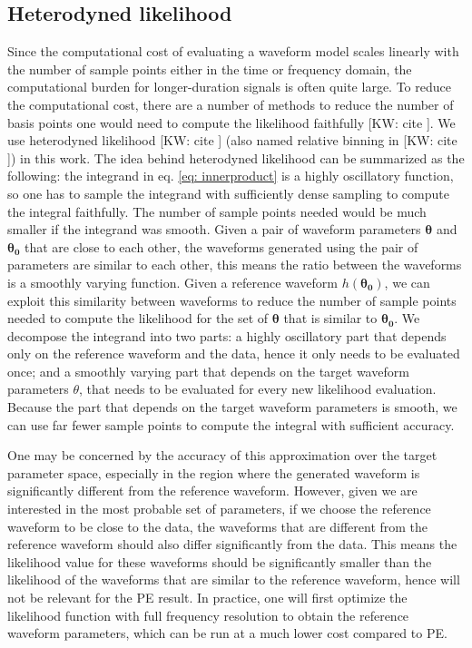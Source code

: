 \documentclass[twocolumn]{aastex631}
\newcommand{\kw}[1]{{\color{rb4}[KW: #1 ]}}
\begin{document}
\subsection{Heterodyned likelihood}

Since the computational cost of evaluating a waveform model scales linearly with
the number of sample points either in the time or frequency domain, the
computational burden for longer-duration signals is often quite large. To
reduce the computational cost, there are a number of methods to reduce the
number of basis points one would need to compute the likelihood faithfully
\kw{cite}. We use heterodyned likelihood \kw{cite} (also named relative binning
in \kw{cite}) in this work. The idea behind heterodyned likelihood can be
summarized as the following: the integrand in eq. \ref{eq: innerproduct} is
a highly oscillatory function, so one has to sample the integrand with
sufficiently dense sampling to compute the integral faithfully. The number of
sample points needed would be much smaller if the integrand was smooth. Given a
pair of waveform parameters $\mathbf{\theta}$ and $\mathbf{\theta_0}$ that are
close to each other, the waveforms generated using the pair of parameters are
similar to each other, this means the ratio between the waveforms is a smoothly
varying function. Given a reference waveform $h(\mathbf{\theta_0})$, we can
exploit this similarity between waveforms to reduce the number of sample points
needed to compute the likelihood for the set of $\mathbf{\theta}$ that is
similar to $\mathbf{\theta_0}$. We decompose the integrand into two parts: a
highly oscillatory part that depends only on the reference waveform and the
data, hence it only needs to be evaluated once; and a smoothly varying part that
depends on the target waveform parameters $\theta$, that needs to be evaluated
for every new likelihood evaluation. Because the part that depends on the target
waveform parameters is smooth, we can use far fewer sample points to compute the
integral with sufficient accuracy.

One may be concerned by the accuracy of this approximation over the target
parameter space, especially in the region where the generated waveform is
significantly different from the reference waveform. However, given we are
interested in the most probable set of parameters, if we choose the reference
waveform to be close to the data, the waveforms that are different from the
reference waveform should also differ significantly from the data. This means
the likelihood value for these waveforms should be significantly smaller than
the likelihood of the waveforms that are similar to the reference waveform,
hence will not be relevant for the PE result. In practice, one will first
optimize the likelihood function with full frequency resolution to obtain the
reference waveform parameters, which can be run at a much lower cost compared to
PE. 
\end{document}
